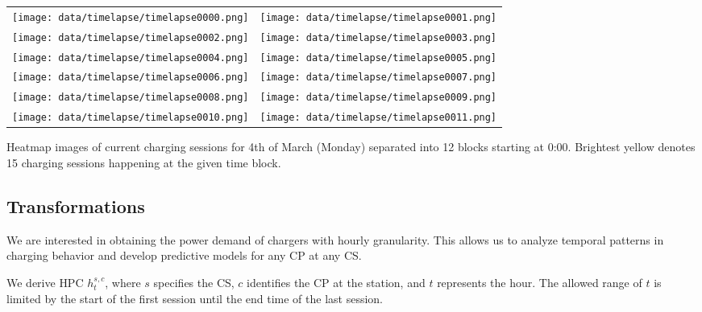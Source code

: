 \begin{marginfigure}
    \begin{tabular}{cc}
        \texttt{[image: data/timelapse/timelapse0000.png]} &
        \texttt{[image: data/timelapse/timelapse0001.png]}   \\
        \texttt{[image: data/timelapse/timelapse0002.png]} &
        \texttt{[image: data/timelapse/timelapse0003.png]}   \\
        \texttt{[image: data/timelapse/timelapse0004.png]} &
        \texttt{[image: data/timelapse/timelapse0005.png]}   \\
        \texttt{[image: data/timelapse/timelapse0006.png]} &
        \texttt{[image: data/timelapse/timelapse0007.png]}   \\
        \texttt{[image: data/timelapse/timelapse0008.png]} &
        \texttt{[image: data/timelapse/timelapse0009.png]}   \\
        \texttt{[image: data/timelapse/timelapse0010.png]} &
        \texttt{[image: data/timelapse/timelapse0011.png]}   \\
    \end{tabular}
    \caption{Heatmap images of current charging sessions for 4th of March (Monday) separated into 12 blocks starting at 0:00. Brightest yellow denotes 15 charging sessions happening at the given time block.}
    \label{fig:timelapse-grid-full}
\end{marginfigure}




\subsection{Transformations}

We are interested in obtaining the power demand of chargers with hourly granularity. This allows us to analyze temporal patterns in charging behavior and develop predictive models for any \acrlong{CP} at any \acrlong{CS}.

We derive \acrlong{HPC} $h^{s,c}_t$, where $s$ specifies the \acrlong{CS}, $c$ identifies the \acrlong{CP} at the station, and $t$ represents the hour. The allowed range of $t$ is limited by the start of the first session until the end time of the last session.

